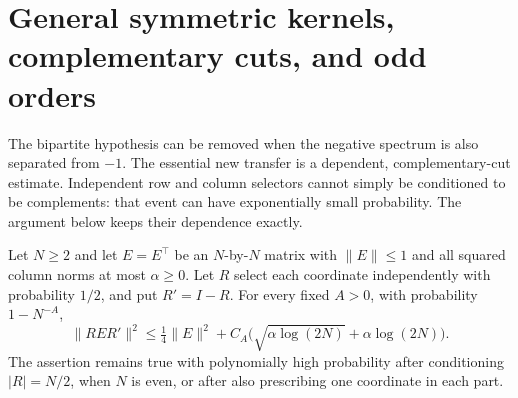 \section{General symmetric kernels, complementary cuts, and odd orders}
\label{sec:generalkernels}
The bipartite hypothesis can be removed when the negative spectrum
is also separated from \(-1\).
The essential new transfer is a dependent, complementary-cut
estimate. Independent row and column selectors cannot simply be
conditioned to be complements: that event can have exponentially
small probability. The argument below keeps their dependence exactly.

\begin{lemma}
\label{lem:complementaryrestriction}
Let \(N\geq2\) and let \(E=E^\top\) be an \(N\)-by-\(N\) matrix with
\(\|E\|\leq1\) and all squared column norms at most \(\alpha\geq0\).
Let \(R\) select each coordinate independently with probability
\(1/2\), and put \(R'=I-R\).
For every fixed \(A>0\), with probability \(1-N^{-A}\),
\[
 \|RER'\|^2\leq\tfrac14\|E\|^2+
       C_A\bigl(\sqrt{\alpha\log(2N)}+\alpha\log(2N)\bigr).
\]
The assertion remains true with polynomially high probability
after conditioning \(|R|=N/2\), when \(N\) is even, or after
also prescribing one coordinate in each part.
\end{lemma}
